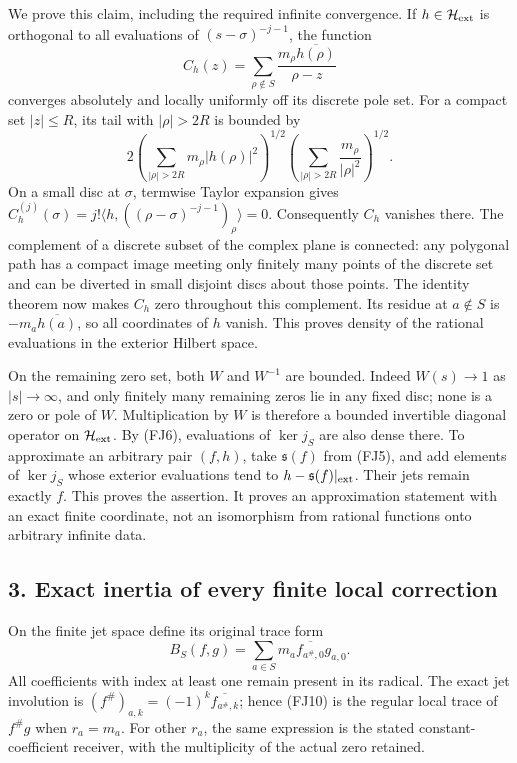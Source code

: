 \documentclass[
  10pt,
  a4paper,
]{article}
\newcounter{none} %
\begin{document}
We prove this claim, including the required infinite convergence. If
\(h\in\mathcal H_{\rm ext}\) is orthogonal to all evaluations of
\((s-\sigma)^{-j-1}\), the function \[
C_h(z)=\sum_{\rho\notin S}\frac{m_\rho\overline{h(\rho)}}{\rho-z}
\tag{FJ8}
\] converges absolutely and locally uniformly off its discrete pole set.
For a compact set \(|z|\le R\), its tail with \(|\rho|>2R\) is bounded
by \[
2\left(\sum_{|\rho|>2R}m_\rho|h(\rho)|^2\right)^{1/2}
 \left(\sum_{|\rho|>2R}\frac{m_\rho}{|\rho|^2}\right)^{1/2}.
\tag{FJ9}
\] On a small disc at \(\sigma\), termwise Taylor expansion gives
\(C_h^{(j)}(\sigma)=j!\langle h,((\rho-\sigma)^{-j-1})_\rho\rangle=0\).
Consequently \(C_h\) vanishes there. The complement of a discrete subset
of the complex plane is connected: any polygonal path has a compact
image meeting only finitely many points of the discrete set and can be
diverted in small disjoint discs about those points. The identity
theorem now makes \(C_h\) zero throughout this complement. Its residue
at \(a\notin S\) is \(-m_a\overline{h(a)}\), so all coordinates of \(h\)
vanish. This proves density of the rational evaluations in the exterior
Hilbert space.

On the remaining zero set, both \(W\) and \(W^{-1}\) are bounded. Indeed
\(W(s)\to1\) as \(|s|\to\infty\), and only finitely many remaining zeros
lie in any fixed disc; none is a zero or pole of \(W\). Multiplication
by \(W\) is therefore a bounded invertible diagonal operator on
\(\mathcal H_{\rm ext}\). By (FJ6), evaluations of \(\ker j_S\) are also
dense there. To approximate an arbitrary pair \((f,h)\), take
\(\mathfrak s(f)\) from (FJ5), and add elements of \(\ker j_S\) whose
exterior evaluations tend to \(h-\mathfrak s(f)|_{\rm ext}\). Their jets
remain exactly \(f\). This proves the assertion. It proves an
approximation statement with an exact finite coordinate, not an
isomorphism from rational functions onto arbitrary infinite data.

\subsection{3. Exact inertia of every finite local
correction}\label{exact-inertia-of-every-finite-local-correction}

On the finite jet space define its original trace form \[
B_S(f,g)=\sum_{a\in S}m_a\overline{f_{a^\#,0}}g_{a,0}.
\tag{FJ10}
\] All coefficients with index at least one remain present in its
radical. The exact jet involution is
\((f^\#)_{a,k}=(-1)^k\overline{f_{a^\#,k}}\); hence (FJ10) is the
regular local trace of \(f^\#g\) when \(r_a=m_a\). For other \(r_a\),
the same expression is the stated constant-coefficient receiver, with
the multiplicity of the actual zero retained.
\end{document}

